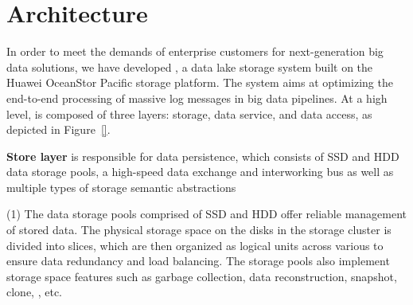 \section{Architecture} 
\label{sec:archi}


In order to meet the demands of enterprise customers for next-generation big data solutions, we have developed \sys, a data lake storage system built on the Huawei OceanStor Pacific storage platform. The system aims at optimizing the end-to-end processing of massive log messages in big data pipelines. At a high level, \sys is composed of three layers: storage, data service, and data access, as depicted in Figure~\ref{}.




\noindent \textbf{Store layer} is responsible for data persistence, which consists of SSD and HDD data storage pools, a high-speed data exchange and interworking bus as well as multiple types of storage semantic abstractions 


(1) The data storage pools comprised of SSD and HDD offer reliable management of stored data.
The physical storage space on the disks in the storage cluster is divided into slices, which are then organized as logical units across various  to ensure data redundancy and load balancing. The storage pools also implement storage space features such as garbage collection, data reconstruction, snapshot, clone, , etc. 



